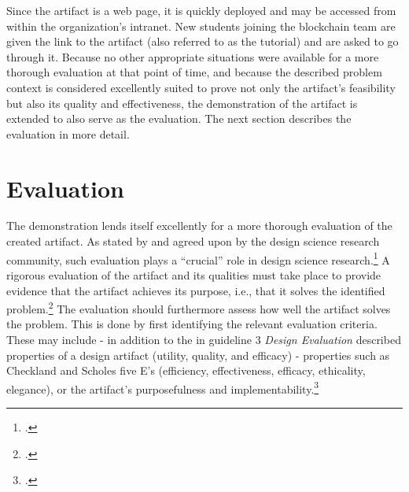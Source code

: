 Since the artifact is a web page, it is quickly deployed and may be accessed from within the organization's intranet. New students joining the blockchain team are given the link to the artifact (also referred to as the tutorial) and are asked to go through it. Because no other appropriate situations were available for a more thorough evaluation at that point of time, and because the described problem context is considered excellently suited to prove not only the artifact's feasibility but also its quality and effectiveness, the demonstration of the artifact is extended to also serve as the evaluation. The next section describes the evaluation in more detail.


\section{Evaluation} \label{sec:Evaluation}

The demonstration lends itself excellently for a more thorough evaluation of the created artifact. As stated by \cite{HevnerDesignScienceResearch2004} and agreed upon by the design science research community, such evaluation plays a \enquote{crucial} role in design science research.\footcites[Cf.][p.258]{MarchDesignnaturalscience1995}[Cf. in addition][]{PfeffersDesignScienceResearch2007}{HevnerDesignScienceResearch2004}{Pries-HejeComprehensiveFrameworkEvaluation2012}{Pries-HejeStrategiesDesignScience} A rigorous evaluation of the artifact and its qualities must take place to provide evidence that the artifact achieves its purpose, i.e., that it solves the identified problem.\footcites[Cf.][p.425]{Pries-HejeComprehensiveFrameworkEvaluation2012} The evaluation should furthermore assess how well the artifact solves the problem. This is done by first identifying the relevant evaluation criteria. These may include - in addition to the in guideline 3 \textit{Design Evaluation} described properties of a design artifact (utility, quality, and efficacy) - properties such as Checkland and Scholes five E's (efficiency, effectiveness, efficacy, ethicality, elegance), or the artifact's purposefulness and implementability.\footcites[Cf.][p.427]{Pries-HejeComprehensiveFrameworkEvaluation2012}[cf. in addition][]{ChecklandSoftSystemsMethodology1990}

